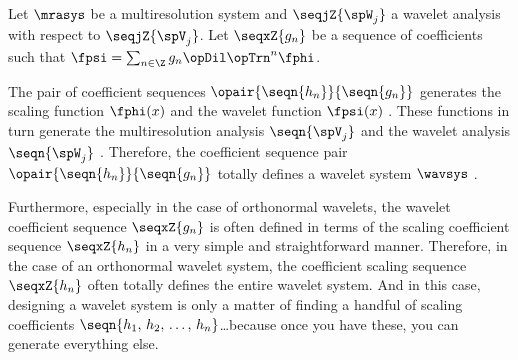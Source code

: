 \begin{definition}
\label{def:wavsys}
\label{def:gn}
Let $\mrasys$ be a multiresolution system 
and $\seqjZ{\spW_j}$ a wavelet analysis 
with respect to $\seqjZ{\spV_j}$.
Let $\seqxZ{g_n}$ be a sequence of coefficients such that 
$\fpsi = \sum_{n\in\Z}  g_n \opDil \opTrn^n \fphi$.
\end{definition}

\begin{remark}
The pair of coefficient sequences $\opair{\seqn{h_n}}{\seqn{g_n}}$ generates 
the scaling function $\fphi(x)$  
and the wavelet function $\fpsi(x)$ .
These functions in turn generate 
the multiresolution analysis $\seqn{\spV_j}$ 
and the wavelet analysis $\seqn{\spW_j}$ .
Therefore, the coefficient sequence pair $\opair{\seqn{h_n}}{\seqn{g_n}}$ 
totally defines a wavelet system $\wavsys$ .

Furthermore, especially in the case of orthonormal wavelets, the wavelet coefficient
sequence $\seqxZ{g_n}$ is often defined in terms of the 
scaling coefficient sequence $\seqxZ{h_n}$
in a very simple and straightforward manner.
Therefore, in the case of an orthonormal wavelet system, the coefficient
scaling sequence $\seqxZ{h_n}$ often totally defines the entire wavelet system.
And in this case, designing a wavelet system is only a matter of finding a handful of
scaling coefficients $\seqn{h_1,\,h_2,\,\ldots,\,h_n}$\ldots because once you have these,
you can generate everything else.
\end{remark}





